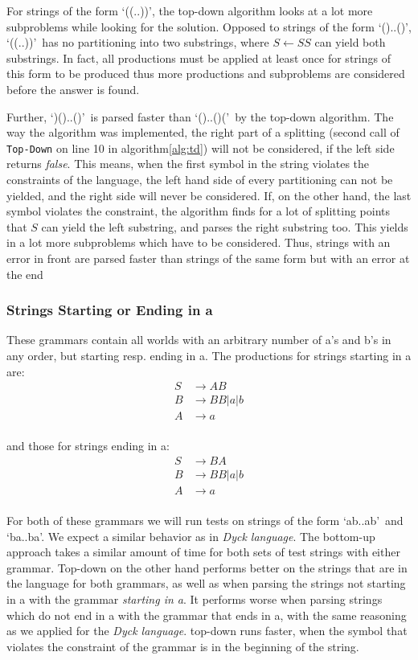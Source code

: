 For strings of the form \lq((..))\rq, the top-down algorithm looks at a lot more subproblems while looking for the solution.
Opposed to strings of the form \lq()..()\rq, \lq((..))\rq~has no partitioning into two substrings, where $S\leftarrow SS$ can yield both substrings.
In fact, all productions must be applied at least once for strings of this form to be produced thus more productions and subproblems are considered before the answer is found.

Further, \lq)()..()\rq~is parsed faster than \lq()..()(\rq~by the top-down algorithm.
The way the algorithm was implemented, the right part of a splitting (second call of \texttt{Top-Down} on line 10 in algorithm\ref{alg:td}) will not be considered, if the left side returns \textit{false}.
This means, when the first symbol in the string violates the constraints of the language, the left hand side of every partitioning can not be yielded, and the right side will never be considered.
If, on the other hand, the last symbol violates the constraint, the algorithm finds for a lot of splitting points that $S$ can yield the left substring, and parses the right substring too.
This yields in a lot more subproblems which have to be considered.
Thus, strings with an error in front are parsed faster than strings of the same form but with an error at the end

\subsubsection{Strings Starting or Ending in a}
These grammars contain all worlds with an arbitrary number of a's and b's in any order, but starting resp. ending in a.
The productions for strings starting in a are:
\begin{align*}
    S&\rightarrow AB\\
    B&\rightarrow BB|a|b\\
    A&\rightarrow a\\
\end{align*}

and those for strings ending in a:
\begin{align*}
    S&\rightarrow BA\\
    B&\rightarrow BB|a|b\\
    A&\rightarrow a\\
\end{align*}

For both of these grammars we will run tests on strings of the form \lq ab..ab\rq~and \lq ba..ba\rq.
We expect a similar behavior as in \textit{Dyck language}.
The bottom-up approach takes a similar amount of time for both sets of test strings with either grammar.
Top-down on the other hand performs better on the strings that are in the language for both grammars, as well as when parsing the strings not starting in a with the grammar \textit{starting in a}.
It performs worse when parsing strings which do not end in a with the grammar that ends in a, with the same reasoning as we applied for the \textit{Dyck language}.
top-down runs faster, when the symbol that violates the constraint of the grammar is in the beginning of the string.


